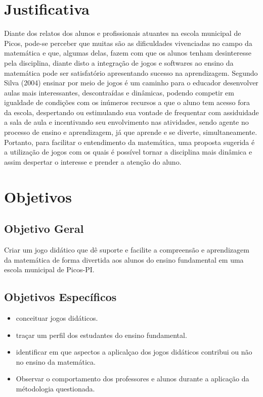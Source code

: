 \documentclass[a4paper,12pt]{article}
\begin{document}
\section{Justificativa}
Diante dos relatos dos alunos e profissionais atuantes na escola municipal de Picos, pode-se perceber que muitas são as dificuldades vivenciadas no campo da matemática e que, algumas delas, fazem com que os alunos tenham desinteresse pela disciplina, diante disto a integração de jogos e softwares ao ensino da matemática pode ser satisfatório apresentando sucesso na aprendizagem. Segundo Silva (2004) ensinar por meio de jogos é um caminho para o educador desenvolver aulas mais interessantes, descontraídas e dinâmicas, podendo competir em igualdade de condições com os inúmeros recursos a que o aluno tem acesso fora da escola, despertando ou estimulando sua vontade de frequentar com assiduidade a sala de aula e incentivando seu envolvimento nas atividades, sendo agente no processo de ensino e aprendizagem, já que aprende e se diverte, simultaneamente. 
Portanto, para facilitar o entendimento da matemática, uma proposta sugerida é a utilização de jogos com os quais é possível tornar a disciplina mais dinâmica e assim despertar o interesse e prender a atenção do aluno.


\section{Objetivos}
\label{sc:objetivos}


\subsection{Objetivo Geral}
Criar um jogo didático que dê suporte e facilite a compreensão e aprendizagem da matemática de forma divertida aos alunos do ensino fundamental em uma escola municipal de Picos-PI.

\subsection{Objetivos Específicos}
\begin{itemize}
\item conceituar jogos didáticos.
\end{itemize}
\begin{itemize}
\item traçar um perfil dos estudantes do ensino fundamental.
\end{itemize}
\begin{itemize}
\item identificar em que aspectos a aplicalçao dos jogos didáticos contribui ou não no ensino da matemática.
\item Observar o comportamento dos professores e alunos durante a aplicação da métodologia questionada.
\end{itemize}
\end{document}
